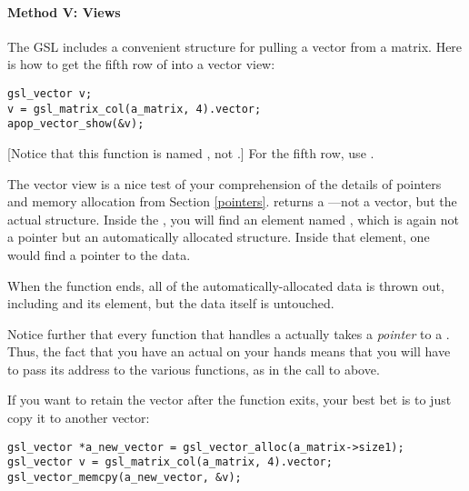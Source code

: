 \paragraph{Method V: Views}
The GSL includes a convenient structure for pulling a vector from a
matrix. Here is how to get the fifth row of  into a vector view:

\begin{lstlisting}
gsl_vector v;
v = gsl_matrix_col(a_matrix, 4).vector;
apop_vector_show(&v);
\end{lstlisting}
[Notice that this function is named , not .]
For the fifth row, use . 

The vector view is a nice test of your comprehension of the details of
pointers and memory allocation from Section \ref{pointers}.
 returns a
---not a vector, but the actual
structure.  Inside the , you will find 
an element named , which is again not a pointer but an
automatically allocated structure. Inside that 
element, one would find a pointer to the data.

When the function ends, all of the automatically-allocated data is
thrown out, including  and its
 element, but the data itself is untouched.

Notice further that every function that handles a
 actually takes a {\em pointer} to a 
. Thus, the fact that you have an actual 
 on your hands means that you will have to pass
its address to the various functions, as in the call to
 above.

If you want to retain the vector after the function exits, your best bet
is to just copy it to another vector:

\begin{lstlisting}
gsl_vector *a_new_vector = gsl_vector_alloc(a_matrix->size1);
gsl_vector v = gsl_matrix_col(a_matrix, 4).vector;
gsl_vector_memcpy(a_new_vector, &v);
\end{lstlisting}

